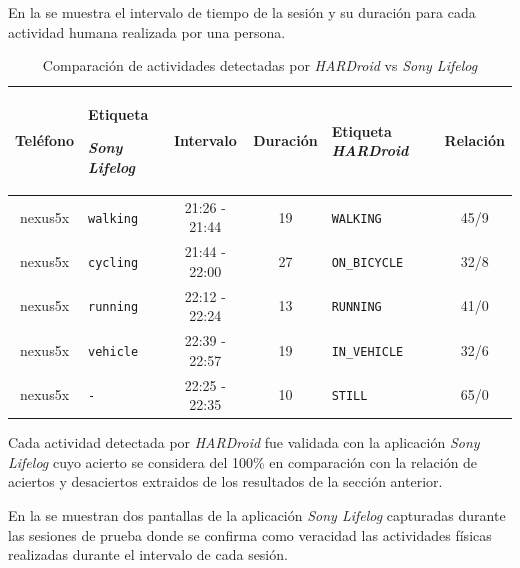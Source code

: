 En la  se muestra el intervalo de tiempo
de la sesión y su duración para cada actividad humana realizada por
una persona.

\begin{table}[h]
\begin{centering}
\begin{tabular}{|c|>{\raggedright}p{3cm}|c|c|>{\raggedright}p{3cm}|c|}
\hline 
Teléfono & Etiqueta 

\emph{Sony Lifelog} & Intervalo & Duración & Etiqueta \emph{HARDroid} & Relación\tabularnewline
\hline 
\hline 
nexus5x & \texttt{walking} & 21:26 - 21:44 & 19 & \texttt{WALKING} & 45/9\tabularnewline
\hline 
nexus5x & \texttt{cycling} & 21:44 - 22:00 & 27 & \texttt{ON\_BICYCLE} & 32/8\tabularnewline
\hline 
nexus5x & \texttt{running} & 22:12 - 22:24 & 13 & \texttt{RUNNING} & 41/0\tabularnewline
\hline 
nexus5x & \texttt{vehicle} & 22:39 - 22:57 & 19 & \texttt{IN\_VEHICLE} & 32/6\tabularnewline
\hline 
nexus5x & \texttt{-} & 22:25 - 22:35 & 10 & \texttt{STILL} & 65/0\tabularnewline
\hline 
\end{tabular}
\par\end{centering}
\caption[Evaluación \emph{HARDroid} vs \emph{Sony LifeLog}]{\label{tab6:vclasificacion}Comparación de actividades detectadas
por \emph{HARDroid} vs\emph{ Sony Lifelog}}
\end{table}

Cada actividad detectada por \emph{HARDroid} fue validada con la aplicación
\emph{Sony} \emph{Lifelog} cuyo acierto se considera del 100\% en
comparación con la relación de aciertos y desaciertos extraidos de
los resultados de la sección anterior. 

En la  se muestran dos pantallas de la aplicación
\emph{Sony Lifelog }capturadas durante las sesiones de prueba donde
se confirma como veracidad las actividades físicas realizadas durante
el intervalo de cada sesión.

